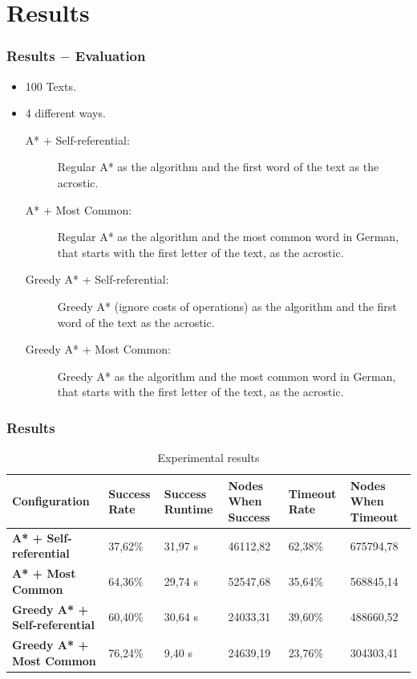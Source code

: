 \documentclass{beamer}
\begin{document}

\section{Results}
\begin{frame}
\frametitle{Results $-$ Evaluation}
\begin{itemize}
	\item 100 Texts.
	\item 4 different ways.
		\begin{description}
			\item[A* + Self-referential:] Regular A* as the algorithm and the first word of the text as the acrostic.
			\item[A* + Most Common:] Regular A* as the algorithm and the most common word in German, that starts with the first letter of the text, as the acrostic.
			\item[Greedy A* + Self-referential:] Greedy A* (ignore costs of operations) as the algorithm and the first word of the text as the acrostic.
			\item[Greedy A* + Most Common:] Greedy A* as the algorithm and the most common word in German, that starts with the first letter of the text, as the acrostic.
		\end{description}
\end{itemize}
\end{frame}

\begin{frame}
\frametitle{Results}

\begin{small}
\begin{table}[h]
\centering
\begin{tabular}{p{2.4cm} | p{1.3cm} | p{1.3cm} | p{1.3cm} | p{1.3cm} | p{1.3cm}}
	\hline
	\textbf{Configuration} & \textbf{Success Rate} & \textbf{Success Runtime} & \textbf{Nodes When Success} & \textbf{Timeout Rate} & \textbf{Nodes When Timeout} \\ \hline
	\textbf{A* + Self-referential}	& 37,62\%	& 31,97 s	& 46112,82	& 62,38\%	& 675794,78 \\ \hline
	\textbf{A* + Most Common}		& 64,36\%	& 29,74 s	& 52547,68	& 35,64\%	& 568845,14 \\ \hline
	\textbf{Greedy A* + Self-referential}	& 60,40\%	& 30,64 s	& 24033,31	& 39,60\%	& 488660,52 \\ \hline
	\textbf{Greedy A* + Most Common}	& 76,24\%	& 9,40 s	& 24639,19	& 23,76\%	& 304303,41 \\ \hline
\end{tabular}
\label{tab:results}
\caption{Experimental results}
\end{table}
\end{small}

\end{frame}
\end{document}
